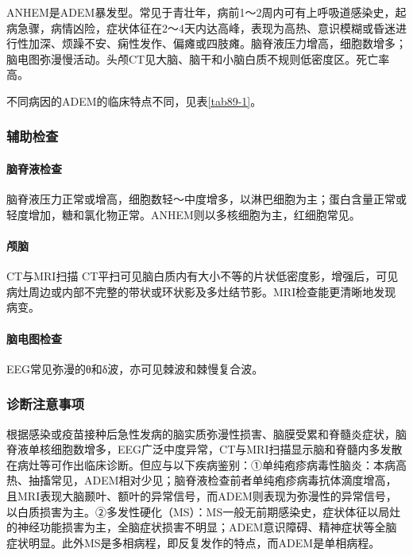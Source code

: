 ANHEM是ADEM暴发型。常见于青壮年，病前1～2周内可有上呼吸道感染史，起病急骤，病情凶险，症状体征在2～4天内达高峰，表现为高热、意识模糊或昏迷进行性加深、烦躁不安、痫性发作、偏瘫或四肢瘫。脑脊液压力增高，细胞数增多；脑电图弥漫慢活动。头颅CT见大脑、脑干和小脑白质不规则低密度区。死亡率高。

不同病因的ADEM的临床特点不同，见表\ref{tab89-1}。

\subsubsection{辅助检查}

\paragraph{脑脊液检查}

脑脊液压力正常或增高，细胞数轻～中度增多，以淋巴细胞为主；蛋白含量正常或轻度增加，糖和氯化物正常。ANHEM则以多核细胞为主，红细胞常见。

\paragraph{颅脑}

CT与MRI扫描
CT平扫可见脑白质内有大小不等的片状低密度影，增强后，可见病灶周边或内部不完整的带状或环状影及多灶结节影。MRI检查能更清晰地发现病变。

\paragraph{脑电图检查}

EEG常见弥漫的θ和δ波，亦可见棘波和棘慢复合波。

\subsubsection{诊断注意事项}

根据感染或疫苗接种后急性发病的脑实质弥漫性损害、脑膜受累和脊髓炎症状，脑脊液单核细胞数增多，EEG广泛中度异常，CT与MRI扫描显示脑和脊髓内多发散在病灶等可作出临床诊断。但应与以下疾病鉴别：①单纯疱疹病毒性脑炎：本病高热、抽搐常见，ADEM相对少见；脑脊液检查前者单纯疱疹病毒抗体滴度增高，且MRI表现大脑颞叶、额叶的异常信号，而ADEM则表现为弥漫性的异常信号，以白质损害为主。②多发性硬化（MS）：MS一般无前期感染史，症状体征以局灶的神经功能损害为主，全脑症状损害不明显；ADEM意识障碍、精神症状等全脑症状明显。此外MS是多相病程，即反复发作的特点，而ADEM是单相病程。

